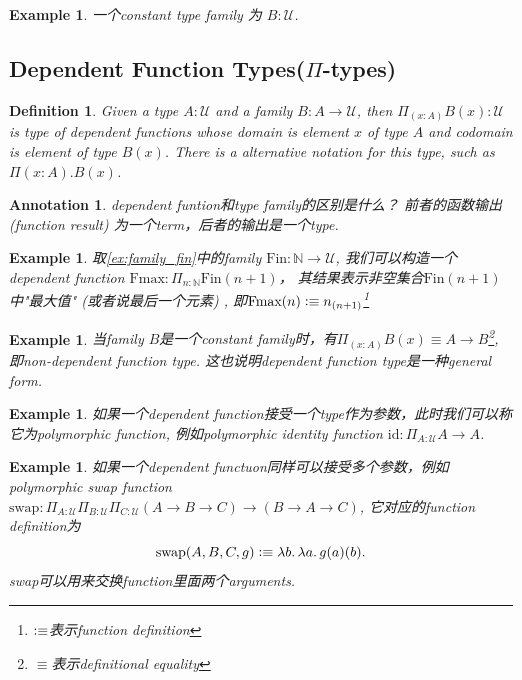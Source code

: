 \documentclass{article}
\newtheorem{example}[theorem]{Example}
\newtheorem{definition}[theorem]{Definition}
\newtheorem{annotation}[theorem]{Annotation}
\newcommand{\lam}[2]{\ensuremath{\lambda #1\ldotp #2}} %
\newcommand{\defeqv}{\vcentcolon\equiv}
\begin{document}
\begin{example}
\rm 一个constant type family 为 $B:\mathcal{U}$. 
\end{example}

\subsection{Dependent Function Types(\texorpdfstring{$\Pi$}{pi}-types)}


\begin{definition}
\rm Given a type $A:\mathcal{U}$ and a family $B:A \to \mathcal{U}$, then $\Pi_{(x:A)} B(x):\mathcal{U}$ is type of dependent functions whose domain is element $x$ of type $A$ and  codomain is element of type $B(x)$. There is a alternative notation for this type, such as $\Pi(x : A).B(x)$.
\end{definition}

\begin{annotation}
\rm dependent funtion和type family的区别是什么？ 前者的函数输出 (function result) 为一个term，后者的输出是一个type.
\end{annotation}


\begin{example}
\rm 取\ref{ex:family_fin}中的family $\text{Fin}:\mathbb{N} \to \mathcal{U}$, 我们可以构造一个dependent function $\text{Fmax}:\Pi_{n : \mathbb{N}} \text{Fin}(n+1)$， 其结果表示非空集合$\text{Fin}(n+1)$中"最大值" (或者说最后一个元素) , 即$\text{Fmax}(n) \defeqv n_{(n+1)}$\footnote{$\defeqv$表示function definition} 
\end{example}

\begin{example}
\rm 当family $B$是一个constant family时，有$\Pi_{(x:A)} B(x) \equiv A \to B$\footnote{$\equiv$表示definitional equality}, 即non-dependent function type. 这也说明dependent function type是一种general form.
\end{example}

\begin{example}
\rm 如果一个dependent function接受一个type作为参数，此时我们可以称它为polymorphic function, 例如polymorphic identity function $\text{id}:\Pi_{A:\mathcal{U}} A \to A$.
\end{example}

\begin{example}
\rm 如果一个dependent functuon同样可以接受多个参数，例如polymorphic swap function $\text{swap}: \Pi_{A:\mathcal{U}}\Pi_{B:\mathcal{U}}\Pi_{C:\mathcal{U}}(A \to B \to C) \to (B \to A \to C)$, 它对应的function definition为
\[
	\text{swap}(A,B,C,g) \defeqv \lam{b}{\lam{a}{g(a)(b)}}.
\]
swap可以用来交换function里面两个arguments.
\end{example}
\end{document}
